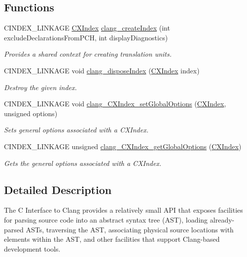 \subsection*{Functions}
\begin{DoxyCompactItemize}
\item 
C\+I\+N\+D\+E\+X\+\_\+\+L\+I\+N\+K\+A\+GE \mbox{\hyperlink{group__CINDEX_gae039c2574bfd75774ca7a9a3e55910cb}{C\+X\+Index}} \mbox{\hyperlink{group__CINDEX_ga51eb9b38c18743bf2d824c6230e61f93}{clang\+\_\+create\+Index}} (int exclude\+Declarations\+From\+P\+CH, int display\+Diagnostics)
\begin{DoxyCompactList}\small\item\em Provides a shared context for creating translation units. \end{DoxyCompactList}\item 
C\+I\+N\+D\+E\+X\+\_\+\+L\+I\+N\+K\+A\+GE void \mbox{\hyperlink{group__CINDEX_ga166ab73b14be73cbdcae14d62dbab22a}{clang\+\_\+dispose\+Index}} (\mbox{\hyperlink{group__CINDEX_gae039c2574bfd75774ca7a9a3e55910cb}{C\+X\+Index}} index)
\begin{DoxyCompactList}\small\item\em Destroy the given index. \end{DoxyCompactList}\item 
C\+I\+N\+D\+E\+X\+\_\+\+L\+I\+N\+K\+A\+GE void \mbox{\hyperlink{group__CINDEX_ga82c320cc4c21dfd64650b3995cb5e7a6}{clang\+\_\+\+C\+X\+Index\+\_\+set\+Global\+Options}} (\mbox{\hyperlink{group__CINDEX_gae039c2574bfd75774ca7a9a3e55910cb}{C\+X\+Index}}, unsigned options)
\begin{DoxyCompactList}\small\item\em Sets general options associated with a C\+X\+Index. \end{DoxyCompactList}\item 
C\+I\+N\+D\+E\+X\+\_\+\+L\+I\+N\+K\+A\+GE unsigned \mbox{\hyperlink{group__CINDEX_ga21e96379358f2aedc56890f9a35d4125}{clang\+\_\+\+C\+X\+Index\+\_\+get\+Global\+Options}} (\mbox{\hyperlink{group__CINDEX_gae039c2574bfd75774ca7a9a3e55910cb}{C\+X\+Index}})
\begin{DoxyCompactList}\small\item\em Gets the general options associated with a C\+X\+Index. \end{DoxyCompactList}\end{DoxyCompactItemize}


\subsection{Detailed Description}
The C Interface to Clang provides a relatively small A\+PI that exposes facilities for parsing source code into an abstract syntax tree (A\+ST), loading already-\/parsed A\+S\+Ts, traversing the A\+ST, associating physical source locations with elements within the A\+ST, and other facilities that support Clang-\/based development tools.

